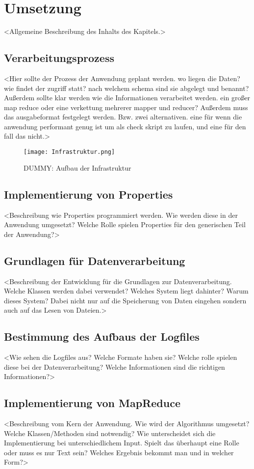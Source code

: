 
\chapter{Umsetzung}\label{cha:Umsetzung}
<Allgemeine Beschreibung des Inhalts des Kapitels.>

\section{Verarbeitungsprozess}
<Hier sollte der Prozess der Anwendung geplant werden. wo liegen die Daten? wie findet der zugriff statt? nach welchem schema sind sie abgelegt und benannt? Außerdem sollte klar werden wie die Informationen verarbeitet werden. ein großer map reduce oder eine verkettung mehrerer mapper und reducer? Außerdem muss das ausgabeformat festgelegt werden. Bzw. zwei alternativen. eine für wenn die anwendung performant genug ist um als check skript zu laufen, und eine für den fall das nicht.>

\begin{figure}
	\centering
	\texttt{[image: Infrastruktur.png]}
	\caption{DUMMY: Aufbau der Infrastruktur}
	\label{fig:AufbauInfrastruktur}
\end{figure}

\section{Implementierung von Properties}
<Beschreibung wie Properties programmiert werden. Wie werden diese in der Anwendung umgesetzt? Welche Rolle spielen Properties für den generischen Teil der Anwendung?>

\section{Grundlagen für Datenverarbeitung}
<Beschreibung der Entwicklung für die Grundlagen zur Datenverarbeitung. Welche Klassen werden dabei verwendet? Welches System liegt dahinter? Warum dieses System? Dabei nicht nur auf die Speicherung von Daten eingehen sondern auch auf das Lesen von Dateien.>

\section{Bestimmung des Aufbaus der Logfiles}
<Wie sehen die Logfiles aus? Welche Formate haben sie? Welche rolle spielen diese bei der Datenverarbeitung? Welche Informationen sind die richtigen Informationen?>

\section{Implementierung von MapReduce}
<Beschreibung vom Kern der Anwendung. Wie wird der Algorithmus umgesetzt? Welche Klassen/Methoden sind notwendig? Wie unterscheidet sich die Implementierung bei unterschiedlichem Input. Spielt das überhaupt eine Rolle oder muss es nur Text sein? Welches Ergebnis bekommt man und in welcher Form?>